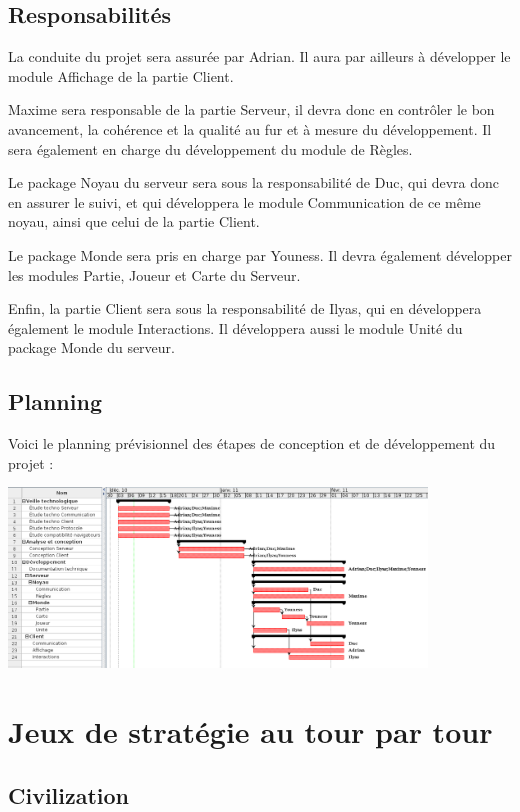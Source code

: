 \documentclass[a4paper,10pt]{report}
\begin{document}
    \section{Responsabilités}

      La conduite du projet sera assurée par Adrian. Il aura par ailleurs à développer le module Affichage de la partie Client. 

      Maxime sera responsable de la partie Serveur, il devra donc en contrôler le bon avancement, la cohérence et la qualité au fur et à mesure du développement. Il sera également en charge du développement du module de Règles. 

      Le package Noyau du serveur sera sous la responsabilité de Duc, qui devra donc en assurer le suivi, et qui développera le module Communication de ce même noyau, ainsi que celui de la partie Client. 

      Le package Monde sera pris en charge par Youness. Il devra également développer les modules Partie, Joueur et Carte du Serveur. 

      Enfin, la partie Client sera sous la responsabilité de Ilyas, qui en développera également le module Interactions. Il développera aussi le module Unité du package Monde du serveur. 


    \section{Planning}

      Voici le planning prévisionnel des étapes de conception et de développement du projet : 
      
      \includegraphics[width=420px]{img/planning.png}


\appendix

\chapter{Jeux de stratégie au tour par tour}

	\section{Civilization}
\end{document}
